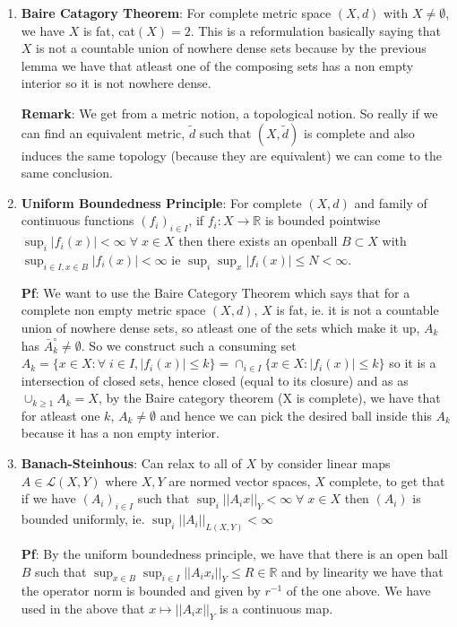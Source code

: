 \documentclass{article}
\begin{document}
\begin{enumerate}
    \item \textbf{Baire Catagory Theorem}: For complete metric space \((X, d)\) with \(X \neq \emptyset\), we have \(X\) is fat, cat\((X) = 2\). This is a reformulation basically saying that \(X\) is not a countable union of nowhere dense sets because by the previous lemma we have that atleast one of the composing sets has a non empty interior so it is not nowhere dense.

    \textbf{Remark}: We get from a metric notion, a topological notion. So really if we can find an equivalent metric, \(\tilde d\) such that \((X, \tilde d)\) is complete and also induces the same topology (because they are equivalent) we can come to the same conclusion.

    \item \textbf{Uniform Boundedness Principle}: For complete \((X,d)\) and family of continuous functions \((f_i)_{i \in I}\), if \(f_i:X \to \mathbb{R}\) is bounded pointwise \(\sup_i |f_i(x)| < \infty \; \forall\; x \in X\) then there exists an openball \(B \subset X\) with \(\sup_{i \in I, x \in B}|f_i(x)| < \infty\) ie \(\sup_i \sup_x |f_i(x)| \leq N < \infty\).

    \textbf{Pf}: We want to use the Baire Category Theorem which says that for a complete non empty metric space \((X,d)\), \(X\) is fat, ie. it is not a countable union of nowhere dense sets, so atleast one of the sets which make it up, \(A_k\) has \(\bar A_k^\circ \neq \emptyset\). So we construct such a consuming set \(A_k = \{x\in X:\forall \; i \in I, |f_i(x)| \leq k\} = \cap_{i \in I}\{x \in X: |f_i(x)|\leq k\}\) so it is a intersection of closed sets, hence closed (equal to its closure) and as as \(\cup_{k \geq 1} A_k = X\), by the Baire category theorem (X is complete), we have that for atleast one \(k\), \(A_k \neq \emptyset\) and hence we can pick the desired ball inside this \(A_k\) because it has a non empty interior.

    \item \textbf{Banach-Steinhous}: Can relax to all of \(X\) by consider linear maps \(A \in \mathcal{L}(X,Y)\) where \(X, Y\) are normed vector spaces, \(X\) complete, to get that if we have \((A_i)_{i \in I}\) such that \(\sup_i||A_i x||_Y < \infty \; \forall \; x \in X\) then \((A_i)\) is bounded uniformly, ie. \(\sup_i||A_i||_{L(X,Y)} < \infty\)

    \textbf{Pf}: By the uniform boundedness principle, we have that there is an open ball \(B\) such that \(\sup_{x \in B}\sup_{i \in I} ||A_ix_i||_Y \leq R \in \mathbb{R}\) and by linearity we have that the operator norm is bounded and given by \(r^{-1}\) of the one above. We have used in the above that \(x \mapsto ||A_ix||_Y\) is a continuous map.\\


\end{enumerate}
\end{document}
